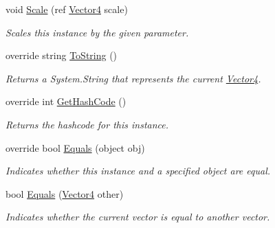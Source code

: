 \begin{DoxyCompactItemize}
void \hyperlink{struct_open_t_k_1_1_vector4_a876fb3abb0a68abd3d136d2c6d309c58}{Scale} (ref \hyperlink{struct_open_t_k_1_1_vector4}{Vector4} scale)
\begin{DoxyCompactList}\small\item\em Scales this instance by the given parameter.\end{DoxyCompactList}\item 
override string \hyperlink{struct_open_t_k_1_1_vector4_a6f7a59232074a5af02fadb85310dc5c7}{To\-String} ()
\begin{DoxyCompactList}\small\item\em Returns a System.\-String that represents the current \hyperlink{struct_open_t_k_1_1_vector4}{Vector4}. \end{DoxyCompactList}\item 
override int \hyperlink{struct_open_t_k_1_1_vector4_a4f1b007b9340e578994aca82e9cb8abe}{Get\-Hash\-Code} ()
\begin{DoxyCompactList}\small\item\em Returns the hashcode for this instance. \end{DoxyCompactList}\item 
override bool \hyperlink{struct_open_t_k_1_1_vector4_af91ad2bd94666f9dd6eba575abcf54e3}{Equals} (object obj)
\begin{DoxyCompactList}\small\item\em Indicates whether this instance and a specified object are equal. \end{DoxyCompactList}\item 
bool \hyperlink{struct_open_t_k_1_1_vector4_ad3aec1842928672bae6b075f06616fd0}{Equals} (\hyperlink{struct_open_t_k_1_1_vector4}{Vector4} other)
\begin{DoxyCompactList}\small\item\em Indicates whether the current vector is equal to another vector.\end{DoxyCompactList}\end{DoxyCompactItemize}
